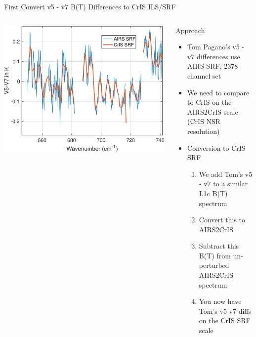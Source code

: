 \documentclass[10pt,t]{beamer}
\begin{document}
\begin{frame}[label={sec:orgbff59a0}]{First Convert v5 - v7 B(T) Differences to CrIS ILS/SRF}
\vspace{-0.3in}

\begin{columns}
\begin{column}{0.55\columnwidth}
\begin{block}{}
\begin{center}
\includegraphics[width=\linewidth]{./Figs/Pdf/v5_minus_v7_airs_srf_and_airs2cris_lw_only.pdf}
\end{center}
\end{block}
\end{column}

\begin{column}{0.55\columnwidth}
\begin{block}{Approach}
\vspace{-0.1in}
\begin{itemize}
\item Tom Pagano's v5 - v7 differences use AIRS SRF, 2378 channel set
\item We need to compare to CrIS on the AIRS2CrIS scale (CrIS NSR resolution)
\item Conversion to CrIS SRF
\begin{enumerate}
\item We add Tom's v5 - v7 to a similar L1c B(T) spectrum
\item Convert this to AIRS2CrIS
\item Subtract this B(T) from un-perturbed AIRS2CrIS spectrum
\item You now have Tom's v5-v7 diffs on the CrIS SRF scale
\end{enumerate}
\end{itemize}
\end{block}
\end{column}
\end{columns}
\end{frame}
\end{document}
